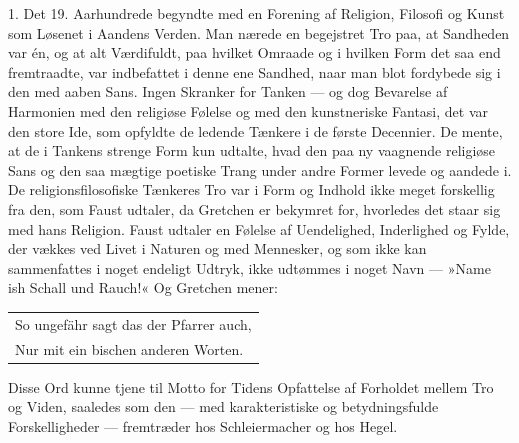 \documentclass[12pt,a4paper,openany]{book}
\newcommand{\opage}[1]{\marginnote{\footnotesize\textit{[#1]}}}
\begin{document}
1. Det 19. Aarhundrede begyndte med en Forening
af Religion, Filosofi og Kunst som Løsenet i Aandens
Verden. Man nærede en begejstret Tro paa, at Sandheden
var én, og at alt Værdifuldt, paa hvilket Omraade
og i hvilken Form det saa end fremtraadte, var indbefattet
i denne ene Sandhed, naar man blot fordybede sig
i den med aaben Sans. Ingen Skranker for Tanken ---
og dog Bevarelse af Harmonien med den religiøse
Følelse og med den kunstneriske Fantasi, det var den store
Ide, som opfyldte de ledende Tænkere i de første Decennier.
De mente, at de i Tankens strenge Form kun udtalte,
hvad den paa ny vaagnende religiøse Sans og den
saa mægtige poetiske Trang under andre Former levede
og aandede i. De religionsfilosofiske Tænkeres Tro var
i Form og Indhold ikke meget forskellig fra den, som
Faust udtaler, da Gretchen er bekymret for, hvorledes
det staar sig med hans Religion. Faust udtaler en
Følelse af Uendelighed, Inderlighed og Fylde, der vækkes
ved Livet i Naturen og med Mennesker, og som ikke
kan sammenfattes i noget endeligt Udtryk, ikke udtømmes
i noget Navn --- »Name ish Schall und Rauch!«
Og Gretchen mener:

\opage{6}\begin{center}\small\begin{tabular}{@{}l@{}}
So ungefähr sagt das der Pfarrer auch,\\
Nur mit ein bischen anderen Worten.
\end{tabular}\end{center}

Disse Ord kunne tjene til Motto for Tidens Opfattelse
af Forholdet mellem Tro og Viden, saaledes som
den --- med karakteristiske og betydningsfulde Forskelligheder
--- fremtræder hos Schleiermacher og hos
Hegel.
\end{document}
